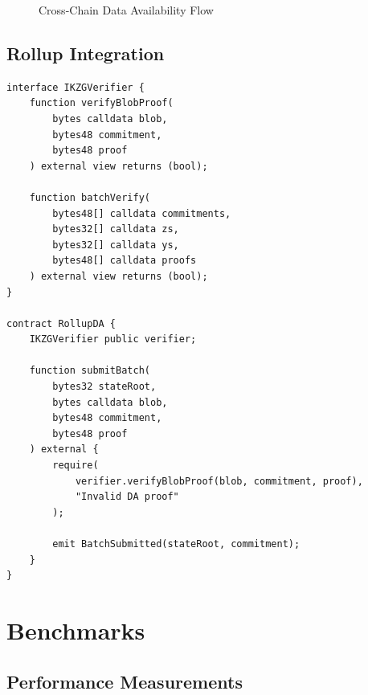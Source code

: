 \documentclass[11pt,a4paper]{article}
\theoremstyle{definition}
\begin{document}
\begin{figure}[h]
\centering
{}
\caption{Cross-Chain Data Availability Flow}
\end{figure}

\subsection{Rollup Integration}

\begin{lstlisting}[language=Solidity, caption={Rollup Data Availability Contract}]
interface IKZGVerifier {
    function verifyBlobProof(
        bytes calldata blob,
        bytes48 commitment,
        bytes48 proof
    ) external view returns (bool);

    function batchVerify(
        bytes48[] calldata commitments,
        bytes32[] calldata zs,
        bytes32[] calldata ys,
        bytes48[] calldata proofs
    ) external view returns (bool);
}

contract RollupDA {
    IKZGVerifier public verifier;

    function submitBatch(
        bytes32 stateRoot,
        bytes calldata blob,
        bytes48 commitment,
        bytes48 proof
    ) external {
        require(
            verifier.verifyBlobProof(blob, commitment, proof),
            "Invalid DA proof"
        );

        emit BatchSubmitted(stateRoot, commitment);
    }
}
\end{lstlisting}

\section{Benchmarks}

\subsection{Performance Measurements}
\end{document}
